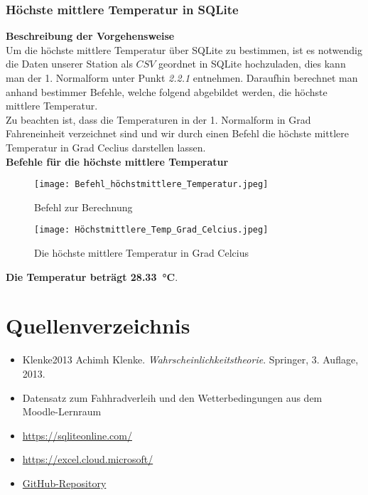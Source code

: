 \documentclass[a4paper,12pt]{article}
\begin{document}
\subsubsection{Höchste mittlere Temperatur in SQLite}
\textbf{Beschreibung der Vorgehensweise}\\Um die höchste mittlere Temperatur über SQLite zu bestimmen, ist es notwendig die Daten unserer Station als $CSV$ geordnet in SQLite hochzuladen, dies kann man der 1. Normalform unter Punkt \textit{2.2.1} entnehmen. Daraufhin berechnet man anhand bestimmer Befehle, welche folgend abgebildet werden, die höchste mittlere Temperatur.\\ Zu beachten ist, dass die Temperaturen in der 1. Normalform in Grad Fahreneinheit verzeichnet sind und wir durch einen Befehl die höchste mittlere Temperatur in Grad Ceclius darstellen lassen.
\vspace{0.5cm}
\\ \textbf{Befehle für die höchste mittlere Temperatur}



\begin{figure}[h]
    \centering
    \texttt{[image: Befehl\_höchstmittlere\_Temperatur.jpeg]}
    \caption{Befehl zur Berechnung}
    \label{fig:enter-label}
\end{figure}

    
\begin{center}
    
\begin{figure}[h]
    \centering
    \texttt{[image: Höchstmittlere\_Temp\_Grad\_Celcius.jpeg]}
    \caption{Die höchste mittlere Temperatur in Grad Celcius}
    \label{fig:enter-label}
\end{figure}
\textbf{Die Temperatur beträgt \SI{28,33}{\degreeCelsius}}.
\end{center}

\newpage
\section{Quellenverzeichnis}

\begin{itemize}

\item Klenke2013  Achimh Klenke. \textit{Wahrscheinlichkeitstheorie}. Springer, 3. Auflage, 2013.
 \item Datensatz zum Fahhradverleih und den Wetterbedingungen aus dem\\Moodle-Lernraum
 \item \url{ https://sqliteonline.com/}
 \item \url{ https://excel.cloud.microsoft/}
 \item \href{https://github.com/Aurola01/Latex-Abgabe-Comet/commit/}{GitHub-Repository}
\end{itemize}
\end{document}
